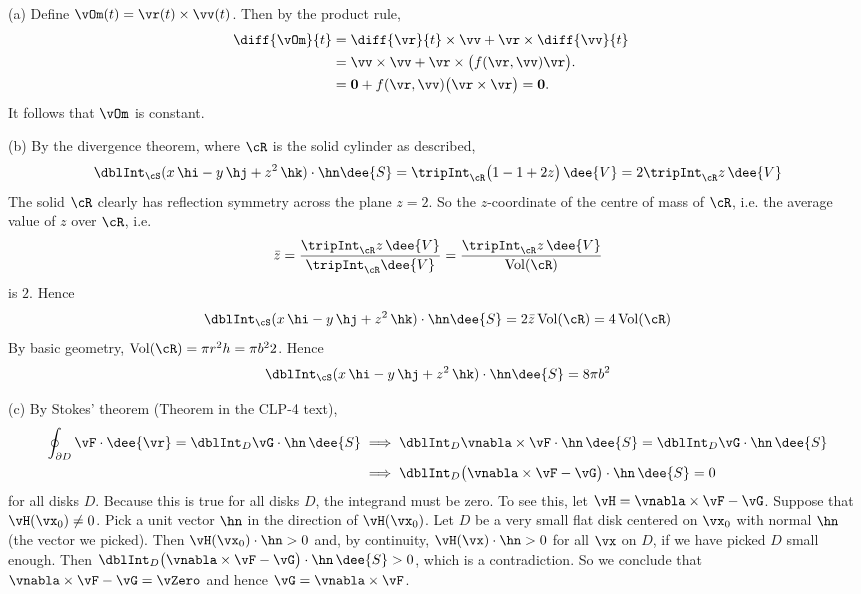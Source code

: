 \begin{solution}
(a)
Define $\vOm(t) = \vr(t)\times\vv(t)$.  Then by the product rule,
\begin{align*}
\diff{\vOm}{t}
&= \diff{\vr}{t}\times\vv + \vr\times\diff{\vv}{t}
\cr
&= \vv\times\vv + \vr\times\big(f(\vr,\vv)\vr\big).
\cr
&= {\bf0} + f(\vr,\vv) \big(\vr\times\vr\big) = {\bf0}.
\end{align*}
It follows that $\vOm$ is constant.


(b)
By the divergence theorem, where $\cR$ is the solid cylinder as
described,
$$
\dblInt_\cS(x\,\hi - y\,\hj + z^2\,\hk)\cdot \hn\dee{S}
= \tripInt_\cR\big(1 - 1 + 2z\big)\,\dee{V}
= 2\tripInt_\cR z\,\dee{V}
$$
The solid $\cR$ clearly has reflection symmetry across the plane $z=2$.
So the $z$-coordinate of the centre of mass of $\cR$, 
i.e. the average value of $z$ over $\cR$,
i.e.
\begin{equation*}
\bar z =\frac{\tripInt_\cR z\,\dee{V}}{\tripInt_\cR\dee{V}}
=\frac{\tripInt_\cR z\,\dee{V}}{{\rm Vol}(\cR)}
\end{equation*}
is $2$. Hence 
$$
\dblInt_\cS(x\,\hi - y\,\hj + z^2\,\hk)\cdot \hn\dee{S}
= 2\bar z\,{\rm Vol}(\cR)
= 4\,{\rm Vol}(\cR)
$$
By basic geometry, ${\rm Vol}(\cR) = \pi r^2 h = \pi b^2 2$.
Hence
$$
\dblInt_\cS(x\,\hi - y\,\hj + z^2\,\hk)\cdot \hn\dee{S}
= 8\pi b^2
$$

(c)
By Stokes' theorem (Theorem  in the
CLP-4 text),
\begin{align*}
\oint_{\partial D} \vF\cdot \dee{\vr}=\dblInt_D \vG\cdot \hn\,\dee{S}
&\implies \dblInt_D \vnabla\times\vF\cdot \hn\,\dee{S}=\dblInt_D \vG\cdot \hn\,\dee{S} \\
&\implies \dblInt_D \big(\vnabla\times\vF-\vG\big)\cdot \hn\,\dee{S}=0
\end{align*}
for all disks $D$. 
Because this is true for all disks $D$, the integrand  must be zero. To see 
this, let $\vH=\vnabla\times\vF-\vG$. Suppose that $\vH(\vx_0)\ne 0$. 
Pick a unit vector $\hn$ in the direction of $\vH(\vx_0)$. Let $D$ be a very 
small flat disk centered on $\vx_0$ with normal $\hn$ (the vector we picked). 
Then $\vH(\vx_0)\cdot\hn>0$ and, by continuity, $\vH(\vx)\cdot\hn>0$ for all 
$\vx$ on $D$, if we have picked $D$ small enough.
 Then $\dblInt_D\big(\vnabla\times\vF-\vG\big)\cdot \hn\,\dee{S}>0$, which is a 
contradiction. So we conclude that
$\vnabla\times\vF-\vG=\vZero$ and hence $\vG=\vnabla\times\vF$.



\end{solution}
